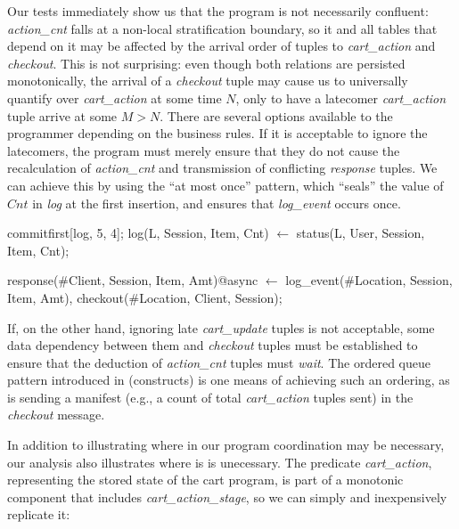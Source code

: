 

Our tests immediately show us that the program is not necessarily confluent: 
{\em action\_cnt} falls at a non-local stratification boundary, so it and all tables that
depend on it may be affected by the arrival order of tuples to {\em cart\_action} and
{\em checkout}.  This is not surprising: even though both relations are persisted monotonically,
the arrival of a {\em checkout} tuple may cause us to universally quantify over {\em cart\_action}
at some time $N$, only to have a latecomer {\em cart\_action} tuple arrive at some $M > N$.
There are several options available to the programmer depending on the business rules.
If it is acceptable to ignore the latecomers, the program must merely ensure that they do not 
cause the recalculation of {\em action\_cnt} and transmission of conflicting {\em response} 
tuples.  We can achieve this by using the ``at most once'' pattern, which ``seals'' the value
of $Cnt$ in {\em log} at the first insertion, and ensures that {\em log\_event} occurs once.
\begin{Dedalus}
commitfirst[log, 5, 4];
log(L, Session, Item, Cnt) \(\leftarrow\) 
    status(L, User, Session, Item, Cnt);

response(#Client, Session, Item, Amt)@async \(\leftarrow\)
    log_event(#Location, Session, Item, Amt),
    checkout(#Location, Client, Session);
\end{Dedalus}


If, on the other hand, ignoring late {\em  cart\_update} tuples is not acceptable,
some data dependency between them and {\em checkout} tuples must be established
to ensure that the deduction of {\em action\_cnt} tuples must {\em wait}.  
The ordered queue pattern introduced in (constructs) is one means of achieving such an 
ordering, as is sending a manifest (e.g., a count of total {\em cart\_action} tuples
sent) in the {\em checkout} message.




In addition to illustrating where in our program coordination may be necessary, our
analysis also illustrates where is is unecessary.
The predicate {\em cart\_action}, representing the stored state 
of the cart program,  is part of a monotonic component that includes {\em cart\_action\_stage}, 
so we can simply and inexpensively replicate it:

